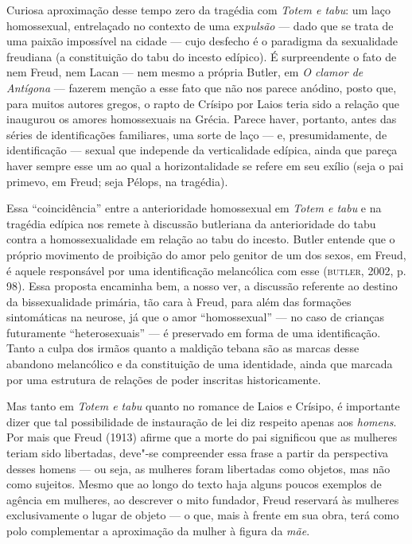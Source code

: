 Curiosa aproximação desse tempo zero da tragédia com \emph{Totem e tabu}:
um laço homossexual, entrelaçado no contexto de uma ex\emph{pulsão} ---
dado que se trata de uma paixão impossível na cidade --- cujo desfecho é
o paradigma da sexualidade freudiana (a constituição do tabu do incesto
edípico). É surpreendente o fato de nem Freud, nem Lacan --- nem mesmo a
própria Butler, em \emph{O clamor de Antígona} --- fazerem menção a esse
fato que não nos parece anódino, posto que, para muitos autores gregos,
o rapto de Crísipo por Laios teria sido a relação que inaugurou os
amores homossexuais na Grécia. Parece haver, portanto, antes das séries
de identificações familiares, uma sorte de laço --- e, presumidamente,
de identificação --- sexual que independe da verticalidade edípica,
ainda que pareça haver sempre esse um ao qual a horizontalidade se
refere em seu exílio (seja o pai primevo, em Freud; seja Pélops, na
tragédia).

Essa ``coincidência'' entre a anterioridade homossexual em \emph{Totem e
tabu} e na tragédia edípica nos remete à discussão butleriana da
anterioridade do tabu contra a homossexualidade em relação ao tabu do
incesto. Butler entende que o próprio movimento de proibição do amor
pelo genitor de um dos sexos, em Freud, é aquele responsável por uma
identificação melancólica com esse (\textsc{butler}, 2002, p. 98). Essa
proposta encaminha bem, a nosso ver, a discussão referente ao destino da
bissexualidade primária, tão cara à Freud, para além das formações
sintomáticas na neurose, já que o amor ``homossexual'' --- no caso de
crianças futuramente ``heterosexuais'' --- é preservado em forma de uma
identificação. Tanto a culpa dos irmãos quanto a maldição tebana são as
marcas desse abandono melancólico e da constituição de uma identidade,
ainda que marcada por uma estrutura de relações de poder inscritas
historicamente.

Mas tanto em \emph{Totem e tabu} quanto no romance de Laios e Crísipo, é
importante dizer que tal possibilidade de instauração de lei diz
respeito apenas aos \emph{homens}. Por mais que Freud (1913) afirme que
a morte do pai significou que as mulheres teriam sido libertadas,
deve"-se compreender essa frase a partir da perspectiva desses homens ---
ou seja, as mulheres foram libertadas como objetos, mas não como
sujeitos. Mesmo que ao longo do texto haja alguns poucos exemplos de
agência em mulheres, ao descrever o mito fundador, Freud reservará às
mulheres exclusivamente o lugar de objeto --- o que, mais à frente em
sua obra, terá como polo complementar a aproximação da mulher à figura
da \emph{mãe}.

